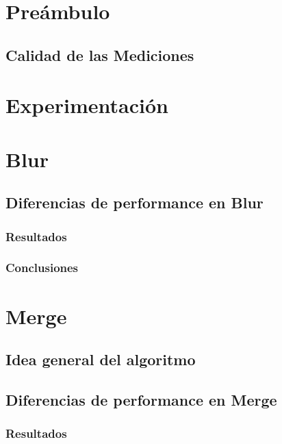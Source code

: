 \documentclass[a4paper]{article}
\begin{document}
\section{Preámbulo}

\subsection{Calidad de las Mediciones}



\newpage

\section{Experimentación}


\newpage

\section{Blur}

\subsection{Diferencias de performance en Blur}


\subsubsection{Resultados}


\subsubsection{Conclusiones}


\newpage
\section{Merge}

\subsection{Idea general del algoritmo}



\subsection{Diferencias de performance en Merge}


\subsubsection{Resultados}
\end{document}
